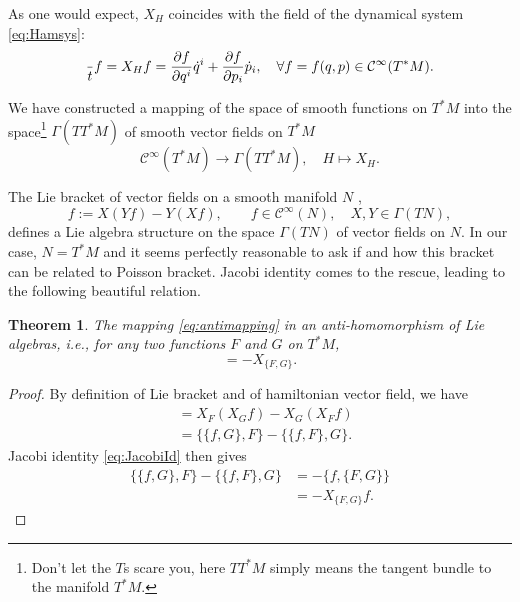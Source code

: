 \documentclass[english,fontsize=11pt,paper=a5,oneside]{scrbook}
\newcommand{\cC}{\mathcal{C}}
\let\d\relax
\newcommand{\d}{\mathrm{d}}
\newtheorem{theorem}{Theorem}[chapter]
\theoremstyle{definition}
\newenvironment{remark}
  {\pushQED{\qed}\renewcommand{\qedsymbol}{$\lozenge$}\remarkx}
  {\popQED\endremarkx}
\begin{document}
\begin{remark}
  As one would expect, $X_H$ coincides with the field of the dynamical system \eqref{eq:Hamsys}:
  \begin{equation}
    \frac{\d}{\d t} f = X_H f = \frac{\partial f}{\partial q^i}\dot q^i + \frac{\partial f}{\partial p_i} \dot p_i, \quad \forall f=f(q,p)\in\cC^\infty(T^* M).
  \end{equation}
\end{remark}

We have constructed a mapping of the space of smooth functions on $T^*M$ into the space\footnote{Don't let the $T$s scare you, here $TT^*M$ simply means the tangent bundle to the manifold $T^*M$.} ${\Gamma(TT^* M)}$ of smooth vector fields on $T^*M$
\begin{equation}\label{eq:antimapping}
  \cC^\infty (T^*M) \to \Gamma(TT^* M), \quad H \mapsto X_H.
\end{equation}

The Lie bracket of vector fields on a smooth manifold $N$ \cite{book:lee},
\begin{equation}
  [X,Y] f := X(Y f) - Y(X f), \qquad f\in\cC^\infty(N), \quad X,Y\in\Gamma(TN),
\end{equation}
defines a Lie algebra structure on the space $\Gamma(TN)$ of vector fields on $N$.
In our case, $N = T^* M$ and it seems perfectly reasonable to ask if and how this bracket can be related to Poisson bracket.
Jacobi identity comes to the rescue, leading to the following beautiful relation.

\begin{theorem}\label{thm:antihom}
  The mapping \eqref{eq:antimapping} in an \emph{anti-homomorphism} of Lie algebras, i.e., for any two functions $F$ and $G$ on $T^*M$,
  \begin{equation}
    [X_{F}, X_{G}] = - X_{\big\{F, G\big\}}.
  \end{equation}
\end{theorem}
\begin{proof}
  By definition of Lie bracket and of hamiltonian vector field, we have
  \begin{align}
    [X_{F}, X_{G}] & = X_{F}(X_{G} f) - X_{G}(X_{F} f)                                    \\
                   & = \big\{\big\{f, G\big\}, F\big\} - \big\{\big\{f, F\big\}, G\big\}.
  \end{align}
  Jacobi identity \eqref{eq:JacobiId} then gives
  \begin{align}
    \big\{\big\{f, G\big\}, F\big\} - \big\{\big\{f, F\big\}, G\big\} & = - \big\{f,\big\{F,G\big\}\big\} \\
                                                                      & = - X_{\big\{F, G\big\}} f.
  \end{align}
\end{proof}
\end{document}

